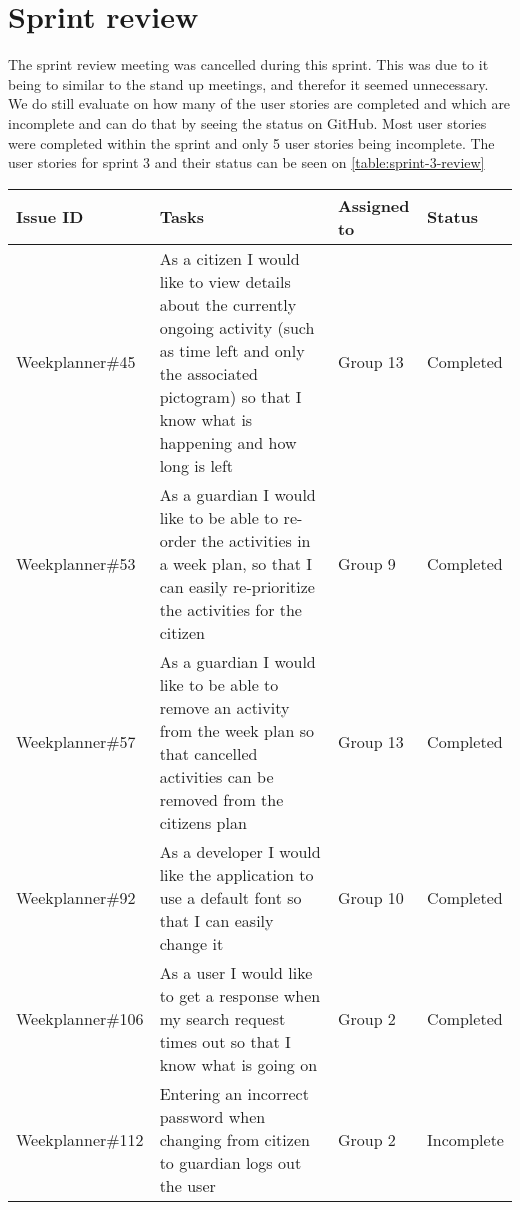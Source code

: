 \section{Sprint review}
The sprint review meeting was cancelled during this sprint. 
This was due to it being to similar to the stand up meetings, and therefor it seemed unnecessary. 
We do still evaluate on how many of the user stories are completed and which are incomplete and can do that by seeing the status on GitHub.
Most user stories were completed within the sprint and only 5 user stories being incomplete.    
The user stories for sprint 3 and their status can be seen on \autoref{table:sprint-3-review}
\begin{longtable}{|p{2.9cm}|p{8cm}|p{2cm}|p{2cm}|}
    \hline
    Issue ID        & Tasks                                                                                                                                                                                    & Assigned to  & Status   \\ \hline
    Weekplanner\#45 & As a citizen I would like to view details about the currently ongoing activity (such as time left and only the associated pictogram) so that I know what is happening and how long is left & Group 13   & Completed         \\ \hline
    Weekplanner\#53 & As a guardian I would like to be able to re-order the activities in a week plan, so that I can easily re-prioritize the activities for the citizen                                      & Group 9       & Completed         \\ \hline
    Weekplanner\#57 & As a guardian I would like to be able to remove an activity from the week plan so that cancelled activities can be removed from the citizens plan                                    & Group 13         & Completed         \\ \hline
    Weekplanner\#92 & As a developer I would like the application to use a default font so that I can easily change it                                                                                       & Group 10       & Completed     \\ \hline
    Weekplanner\#106 & As a user I would like to get a response when my search request times out so that I know what is going on                                                                             & Group 2        & Completed    \\ \hline
    Weekplanner\#112 & Entering an incorrect password when changing from citizen to guardian logs out the user                                                                                                  & Group 2     & Incomplete    \\ \hline

\end{longtable}
